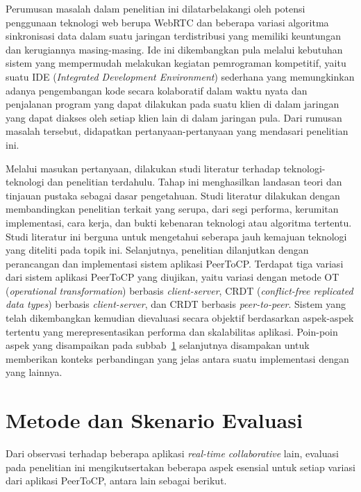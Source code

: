 Perumusan masalah dalam penelitian ini dilatarbelakangi oleh potensi penggunaan teknologi web berupa WebRTC dan beberapa variasi algoritma sinkronisasi data dalam suatu jaringan terdistribusi yang memiliki keuntungan dan kerugiannya masing-masing. Ide ini dikembangkan pula melalui kebutuhan sistem yang mempermudah melakukan kegiatan pemrograman kompetitif, yaitu suatu IDE (\textit{Integrated Development Environment}) sederhana yang memungkinkan adanya pengembangan kode secara kolaboratif dalam waktu nyata dan penjalanan program yang dapat dilakukan pada suatu klien di dalam jaringan yang dapat diakses oleh setiap klien lain di dalam jaringan pula. Dari rumusan masalah tersebut, didapatkan pertanyaan-pertanyaan yang mendasari penelitian ini.

Melalui masukan pertanyaan, dilakukan studi literatur terhadap teknologi-teknologi dan penelitian terdahulu. Tahap ini menghasilkan landasan teori dan tinjauan pustaka sebagai dasar pengetahuan. Studi literatur dilakukan dengan membandingkan penelitian terkait yang serupa, dari segi performa, kerumitan implementasi, cara kerja, dan bukti kebenaran teknologi atau algoritma tertentu. Studi literatur ini berguna untuk mengetahui seberapa jauh kemajuan teknologi yang diteliti pada topik ini. Selanjutnya, penelitian dilanjutkan dengan perancangan dan implementasi sistem aplikasi PeerToCP. Terdapat tiga variasi dari sistem aplikasi PeerToCP yang diujikan, yaitu variasi dengan metode OT (\textit{operational transformation}) berbasis \textit{client-server}, CRDT (\textit{conflict-free replicated data types}) berbasis \textit{client-server}, dan CRDT berbasis \textit{peer-to-peer}. Sistem yang telah dikembangkan kemudian dievaluasi secara objektif berdasarkan aspek-aspek tertentu yang merepresentasikan performa dan skalabilitas aplikasi. Poin-poin aspek yang disampaikan pada subbab~\ref{sec:evaluasi} selanjutnya disampakan untuk memberikan konteks perbandingan yang jelas antara suatu implementasi dengan yang lainnya.

\section{Metode dan Skenario Evaluasi}
\label{sec:evaluasi}

Dari observasi terhadap beberapa aplikasi \textit{real-time collaborative} lain, evaluasi pada penelitian ini mengikutsertakan beberapa aspek esensial untuk setiap variasi dari aplikasi PeerToCP, antara lain sebagai berikut.


